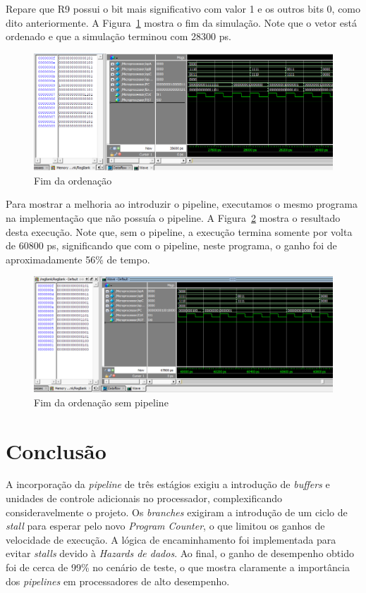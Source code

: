 \documentclass[11pt,a4paper,titlepage]{article}
\begin{document}
Repare que R9 possui o bit mais significativo com valor 1 e os outros bits 0, como dito anteriormente.
A Figura~\ref{fig:ordena2} mostra o fim da simulação.
Note que o vetor está ordenado e que a simulação terminou com 28300 ps.


\begin{figure}[!h]
\centering
\includegraphics[scale=0.5]{images/ordena2.png}
\caption{Fim da ordenação}
\label{fig:ordena2}
\end{figure}

Para mostrar a melhoria ao introduzir o pipeline, executamos o mesmo programa na implementação que não possuía o pipeline.
A Figura~\ref{fig:ordenasp2} mostra o resultado desta execução.
Note que, sem o pipeline, a execução termina somente por volta de 60800 ps, significando que com o pipeline, neste programa, o ganho foi de aproximadamente 56\% de tempo.

\begin{figure}[!h]
\centering
\includegraphics[scale=0.5]{images/ordenasp2.png}
\caption{Fim da ordenação sem pipeline}
\label{fig:ordenasp2}
\end{figure}
\section{Conclusão}

A incorporação da \textit{pipeline} de três estágios exigiu a introdução de \textit{buffers} e unidades de
controle adicionais no processador, complexificando consideravelmente o projeto. Os \textit{branches} exigiram
a introdução de um ciclo de \textit{stall} para esperar pelo novo \textit{Program Counter}, o que limitou
os ganhos de velocidade de execução. A lógica de encaminhamento foi implementada para evitar \textit{stalls}
devido à \textit{Hazards de dados}. Ao final, o ganho de desempenho obtido foi de cerca de 99\% no cenário de 
teste, o que mostra claramente a importância dos \textit{pipelines} em processadores de alto desempenho.


%

\nocite{*}
\end{document}
